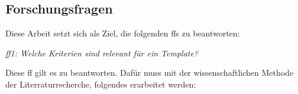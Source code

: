 \subsection{Forschungsfragen} \label{sec:forschungsfrage}

Diese Arbeit setzt sich als Ziel, die folgenden \acp{ff} zu beantworten:

\textit{\ac{ff}1: Welche Kriterien sind relevant für ein Template?}

Diese \acl{ff} gilt es zu beantworten. Dafür muss mit der wissenschaftlichen Methode der Literraturrecherche, folgendes erarbeitet werden: 
